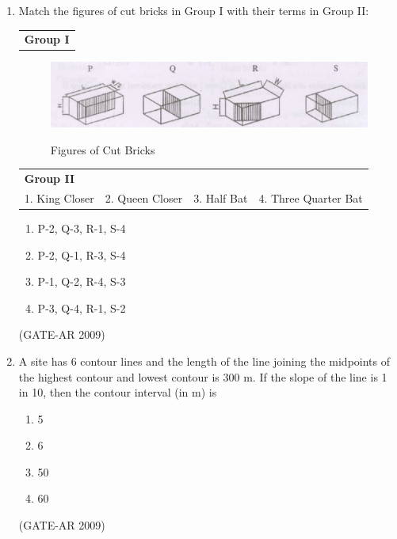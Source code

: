 \documentclass[a4paper,10pt]{article}
\begin{document}
\begin{enumerate}
    \item Match the figures of cut bricks in Group I with their terms in Group II:  \\
    \begin{tabular}{ l }
	\textbf{Group I} \\
	\end{tabular}
	\begin{figure}[h!]
        \centering
        \includegraphics[width=0.5\linewidth]{figs/01.jpg}
        \label{fig:Img01}
	\caption{Figures of Cut Bricks}
	\end{figure}
    \begin{tabular}{ l l l l }
	\textbf{Group II} & & & \\
	1. King Closer & 2. Queen Closer & 3. Half Bat & 4. Three Quarter Bat \\
	\end{tabular}
	\begin{multicols}{2}
	\begin{enumerate}
        \item P-2, Q-3, R-1, S-4
        \item P-2, Q-1, R-3, S-4
        \item P-1, Q-2, R-4, S-3
        \item P-3, Q-4, R-1, S-2
    \end{enumerate}
	\end{multicols}
    \hfill (GATE-AR 2009)

    \item A site has 6 contour lines and the length of the line joining the midpoints of the highest contour and lowest contour is 300 m. If the slope of the line is 1 in 10, then the contour interval (in m) is 
    \begin{multicols}{4}
	\begin{enumerate}
        \item 5
        \item 6
        \item 50
        \item 60
    \end{enumerate}
	\end{multicols}
    \hfill (GATE-AR 2009)
	

\end{enumerate}
\end{document}

